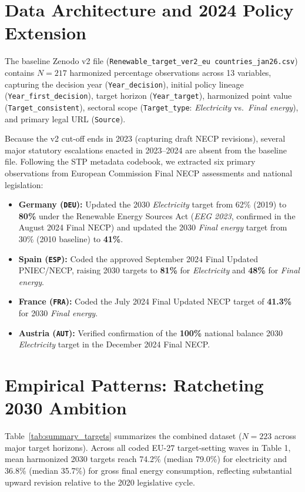 \documentclass[11pt,a4paper]{article}
\begin{document}
\section{Data Architecture and 2024 Policy Extension}
The baseline Zenodo v2 file (\texttt{Renewable\_target\_ver2\_eu countries\_jan26.csv}) contains $N = 217$ harmonized percentage observations across 13 variables, capturing the decision year (\texttt{Year\_decision}), initial policy lineage (\texttt{Year\_first\_decision}), target horizon (\texttt{Year\_target}), harmonized point value (\texttt{Target\_consistent}), sectoral scope (\texttt{Target\_type}: \textit{Electricity} vs.\ \textit{Final energy}), and primary legal URL (\texttt{Source}).

Because the v2 cut-off ends in 2023 (capturing draft NECP revisions), several major statutory escalations enacted in 2023--2024 are absent from the baseline file. Following the STP metadata codebook, we extracted six primary observations from European Commission Final NECP assessments and national legislation:
\begin{itemize}
    \item \textbf{Germany (\texttt{DEU}):} Updated the 2030 \textit{Electricity} target from 62\% (2019) to \textbf{80\%} under the Renewable Energy Sources Act (\textit{EEG 2023}, confirmed in the August 2024 Final NECP) and updated the 2030 \textit{Final energy} target from 30\% (2010 baseline) to \textbf{41\%}.
    \item \textbf{Spain (\texttt{ESP}):} Coded the approved September 2024 Final Updated PNIEC/NECP, raising 2030 targets to \textbf{81\%} for \textit{Electricity} and \textbf{48\%} for \textit{Final energy}.
    \item \textbf{France (\texttt{FRA}):} Coded the July 2024 Final Updated NECP target of \textbf{41.3\%} for 2030 \textit{Final energy}.
    \item \textbf{Austria (\texttt{AUT}):} Verified confirmation of the \textbf{100\%} national balance 2030 \textit{Electricity} target in the December 2024 Final NECP.
\end{itemize}



\section{Empirical Patterns: Ratcheting 2030 Ambition}
Table~\ref{tab:summary_targets} summarizes the combined dataset ($N = 223$ across major target horizons). Across all coded EU-27 target-setting waves in Table 1, mean harmonized 2030 targets reach 74.2\% (median 79.0\%) for electricity and 36.8\% (median 35.7\%) for gross final energy consumption, reflecting substantial upward revision relative to the 2020 legislative cycle.
\end{document}
